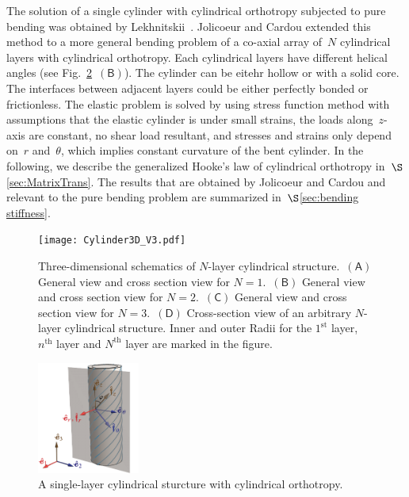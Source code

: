 \documentclass[preprint,12pt,times]{elsarticle}
\numberwithin{equation}{section}
\newcommand{\pr}[1]{\left( #1 \right)}
\newcommand{\subf}[1]{\pr{\textsf{#1}}}
\renewcommand{\>}{$\Rightarrow$}
\begin{document}
The solution of a single cylinder with cylindrical orthotropy subjected to pure bending was obtained by Lekhnitskii~\cite{Lekhnitskii1981}. Jolicoeur and Cardou extended this method to a more general bending problem of a co-axial array of~$N$ cylindrical layers with cylindrical orthotropy. Each cylindrical layers have different helical angles (see Fig.~\ref{fig:schematic}~$\subf{B}$). The cylinder can be eitehr hollow or with a solid core. The interfaces between adjacent layers could be either perfectly bonded or frictionless. The elastic problem is solved by using stress function method with assumptions that the elastic cylinder is under small strains, the loads along~$z$-axis are constant, no shear load resultant, and stresses and strains only depend on~$r$ and~$\theta$, which implies constant curvature of the bent cylinder. In the following, we describe the generalized Hooke's law of cylindrical orthotropy in~$\S$\ref{sec:MatrixTrans}. The results that are obtained by Jolicoeur and Cardou and relevant to the pure bending problem are summarized in~$\S$\ref{sec:bending stiffness}.


\begin{figure}[t]
  \centering
  \graphicspath{{../LyxFiles/figure/}}
   \texttt{[image: Cylinder3D\_V3.pdf]}
  \caption{Three-dimensional schematics of  $N$-layer cylindrical structure.~$\subf{A}$ General view and cross section view for $N = 1$.~$\subf{B}$ General view and cross section view for $N = 2$.~$\subf{C}$ General view and cross section view for $N = 3$.~$\subf{D}$ Cross-section view of an arbitrary $N$-layer cylindrical structure. Inner and outer Radii for the $1^\text{st}$ layer, $n^\text{th}$ layer and $N^\text{th}$ layer are marked in the figure.}
  \label{fig:Cylinder3D}
\end{figure}


\begin{figure}[t]
	\centering
	\graphicspath{{../LyxFiles/figure/}}
	\includegraphics[width=0.3\textwidth]{schematic_V5.pdf}
	\caption{A single-layer cylindrical sturcture with cylindrical orthotropy.
  }
	\label{fig:schematic}
\end{figure}
\end{document}
